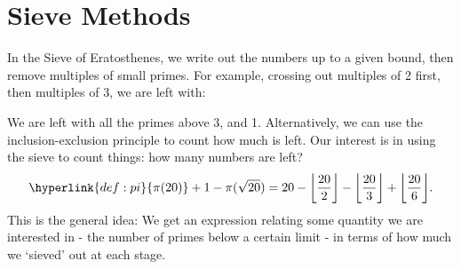\documentclass{article}
\newcommand{\1}{\mathbbm{1}}
\DeclarePairedDelimiter\floor{\lfloor}{\rfloor}
\begin{document}
\clearpage
\section{Sieve Methods}
\newlec
In the Sieve of Eratosthenes, we write out the numbers up to a given bound, then remove multiples of small primes. For example, crossing out multiples of 2 first, then multiples of 3, we are left with:
\begin{center}
\end{center}
We are left with all the primes above 3, and 1. Alternatively, we can use the inclusion-exclusion principle to count how much is left.
Our interest is in using the sieve to count things: how many numbers are left?
\begin{align*}
  \hyperlink{def:pi}{\pi(20)} + 1 - \pi(\sqrt{20}) = 20 - \floor*{\frac{20}{2}} - \floor*{\frac{20}{3}} + \floor*{\frac{20}{6}}.
\end{align*}
This is the general idea: We get an expression relating some quantity we are interested in - the number of primes below a certain limit - in terms of how much we `sieved' out at each stage.
\end{document}
